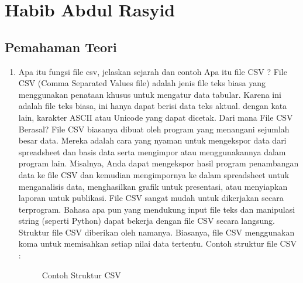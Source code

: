 \section{Habib Abdul Rasyid}
\subsection{Pemahaman Teori}
\begin {enumerate}
\item Apa itu fungsi file csv, jelaskan sejarah dan contoh Apa itu file CSV ?
File CSV (Comma Separated Values file) adalah jenis file teks biasa yang menggunakan penataan khusus untuk mengatur data tabular. Karena ini adalah file teks biasa, ini hanya dapat berisi data teks aktual. dengan kata lain, karakter ASCII atau Unicode 	yang dapat dicetak.
Dari mana File CSV Berasal?
File CSV biasanya dibuat oleh program yang menangani sejumlah besar data. Mereka adalah cara yang nyaman untuk mengekspor data dari spreadsheet dan basis data serta mengimpor atau menggunakannya dalam program lain. Misalnya, Anda dapat mengekspor hasil program penambangan data ke file CSV dan kemudian mengimpornya ke dalam spreadsheet untuk menganalisis data, menghasilkan grafik untuk presentasi, atau menyiapkan laporan untuk publikasi.
File CSV sangat mudah untuk dikerjakan secara terprogram. Bahasa apa pun yang mendukung input file teks dan manipulasi string (seperti Python) dapat bekerja dengan file CSV secara langsung.
Struktur file CSV diberikan oleh namanya. Biasanya, file CSV menggunakan koma untuk memisahkan setiap nilai data tertentu.
Contoh struktur file CSV :

\begin{figure}[h]
\centering
\caption{Contoh Struktur CSV}
\label{fig:csv}
\end{figure}


\end{enumerate}

